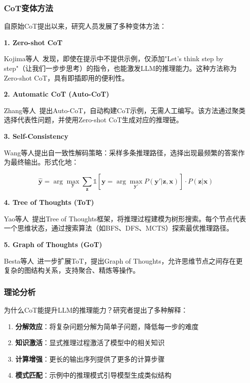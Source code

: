 \subsubsection{CoT变体方法}

自原始CoT提出以来，研究人员发展了多种变体方法：

\textbf{1. Zero-shot CoT}

Kojima等人~\cite{kojima2022large}发现，即使在提示中不提供示例，仅添加"Let's think step by step"（让我们一步步思考）的指令，也能激发LLM的推理能力。这种方法称为Zero-shot CoT，具有即插即用的便利性。

\textbf{2. Automatic CoT (Auto-CoT)}

Zhang等人~\cite{zhang2023automatic}提出Auto-CoT，自动构建CoT示例，无需人工编写。该方法通过聚类选择代表性问题，并使用Zero-shot CoT生成对应的推理链。

\textbf{3. Self-Consistency}

Wang等人\cite{wang2023selfconsistency}提出自一致性解码策略：采样多条推理路径，选择出现最频繁的答案作为最终输出。形式化地：

\begin{equation}\label{eq:self_consistency}
    \hat{\mathbf{y}} = \arg\max_{\mathbf{y}} \sum_{\mathbf{z}} \mathbb{1}[\mathbf{y} = \arg\max_{\mathbf{y}'} P(\mathbf{y}'|\mathbf{z}, \mathbf{x})] \cdot P(\mathbf{z}|\mathbf{x})
\end{equation}

\textbf{4. Tree of Thoughts (ToT)}

Yao等人~\cite{yao2023tree}提出Tree of Thoughts框架，将推理过程建模为树形搜索。每个节点代表一个思维状态，通过搜索算法（如BFS、DFS、MCTS）探索最优推理路径。

\textbf{5. Graph of Thoughts (GoT)}

Besta等人~\cite{besta2024graph}进一步扩展ToT，提出Graph of Thoughts，允许思维节点之间存在更复杂的图结构关系，支持聚合、精炼等操作。

\subsubsection{理论分析}

为什么CoT能提升LLM的推理能力？研究者提出了多种解释：

\begin{enumerate}[leftmargin=2em]
    \item \textbf{分解效应}：将复杂问题分解为简单子问题，降低每一步的难度
    \item \textbf{知识激活}：显式推理过程激活了模型中的相关知识
    \item \textbf{计算增强}：更长的输出序列提供了更多的计算步骤
    \item \textbf{模式匹配}：示例中的推理模式引导模型生成类似结构
\end{enumerate}

